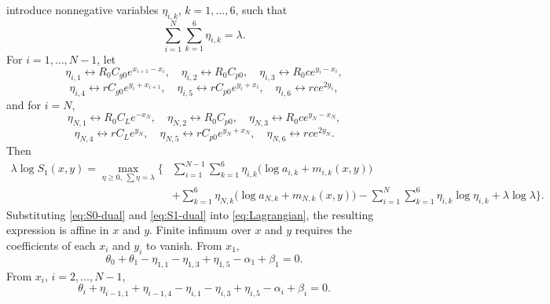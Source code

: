 \documentclass{article}
\begin{document}
introduce nonnegative variables \(\eta_{i,k}\), \(k=1,\dots,6\), such that
\begin{equation} \nonumber
	\sum_{i=1}^N\sum_{k=1}^6 \eta_{i,k}=\lambda.
	\label{eq:eta-sum}
\end{equation}
For \(i=1,\dots,N-1\), let
\begin{equation} \nonumber
	\eta_{i,1}\leftrightarrow R_0C_{g0}e^{x_{i+1}-x_i},\quad
	\eta_{i,2}\leftrightarrow R_0C_{p0},\quad
	\eta_{i,3}\leftrightarrow R_0ce^{y_i-x_i},
\end{equation}
\begin{equation} \nonumber
	\eta_{i,4}\leftrightarrow rC_{g0}e^{y_i+x_{i+1}},\quad
	\eta_{i,5}\leftrightarrow rC_{p0}e^{y_i+x_i},\quad
	\eta_{i,6}\leftrightarrow rce^{2y_i},
\end{equation}
and for \(i=N\),
\begin{equation} \nonumber
	\eta_{N,1}\leftrightarrow R_0C_Le^{-x_N},\quad
	\eta_{N,2}\leftrightarrow R_0C_{p0},\quad
	\eta_{N,3}\leftrightarrow R_0ce^{y_N-x_N},
\end{equation}
\begin{equation} \nonumber
	\eta_{N,4}\leftrightarrow rC_Le^{y_N},\quad
	\eta_{N,5}\leftrightarrow rC_{p0}e^{y_N+x_N},\quad
	\eta_{N,6}\leftrightarrow rce^{2y_N}.
\end{equation}
Then
\begin{equation}
	\begin{aligned}
		\lambda \log S_1(x,y)
		=
		\max_{\eta \ge 0,\ \sum \eta = \lambda}
		\Bigg\{
		 & \sum_{i=1}^{N-1}\sum_{k=1}^{6}
		\eta_{i,k}\bigl(\log a_{i,k}+m_{i,k}(x,y)\bigr)
		\\&+\sum_{k=1}^{6}
		\eta_{N,k}\bigl(\log a_{N,k}+m_{N,k}(x,y)\bigr)
		-\sum_{i=1}^{N}\sum_{k=1}^{6}
		\eta_{i,k}\log \eta_{i,k}
		+\lambda \log \lambda
		\Bigg\}.
	\end{aligned}
	\label{eq:S1-dual}
\end{equation}
Substituting \eqref{eq:S0-dual} and \eqref{eq:S1-dual} into \eqref{eq:Lagrangian}, the resulting expression is affine in \(x\) and \(y\). Finite infimum over \(x\) and \(y\) requires the coefficients of each \(x_i\) and \(y_i\) to vanish.
From \(x_1\),
\begin{equation}\nonumber
	\theta_0+\theta_1-\eta_{1,1}-\eta_{1,3}+\eta_{1,5}-\alpha_1+\beta_1=0.
	\label{eq:x1-balance}
\end{equation}
From \(x_i\), \(i=2,\dots,N-1\),
\begin{equation}\nonumber
	\theta_i+\eta_{i-1,1}+\eta_{i-1,4}-\eta_{i,1}-\eta_{i,3}+\eta_{i,5}-\alpha_i+\beta_i=0.
	\label{eq:xi-balance}
\end{equation}
\end{document}
